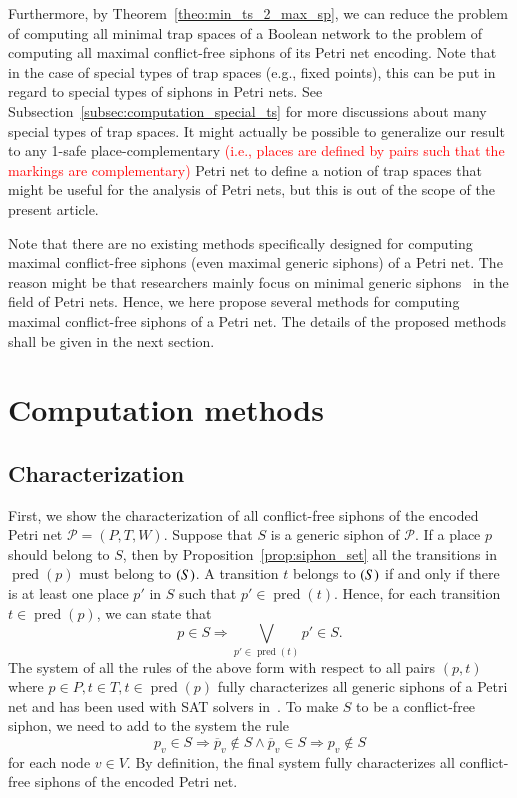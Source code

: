 \documentclass[preprint,12pt]{elsarticle}
\newcommand{\change}[1]{\textcolor{red}{#1}}
\DeclareMathOperator{\pred}{pred}
\let\succ\relax
\DeclareMathOperator{\succ}{succ}
\begin{document}
Furthermore, by Theorem~\ref{theo:min_ts_2_max_sp}, we can reduce the problem of computing all minimal trap spaces of a Boolean network to the problem of computing all maximal conflict-free siphons of its Petri net encoding.
Note that in the case of special types of trap spaces (e.g., fixed points), this can be put in regard to special types of siphons in Petri nets.
See Subsection~\ref{subsec:computation_special_ts} for more discussions about many special types of trap spaces.
It might actually be possible to generalize our result to any 1-safe place-complementary \change{(i.e., places are defined by pairs such that the markings are complementary)} Petri net to define a notion of trap spaces that might be useful for the analysis of Petri nets, but this is out of the scope of the present article.

Note that there are no existing methods specifically designed for computing maximal conflict-free siphons (even maximal generic siphons) of a Petri net.
The reason might be that researchers mainly focus on minimal generic siphons~\cite{DBLP:journals/isci/LiuB16} in the field of Petri nets.
Hence, we here propose several methods for computing maximal conflict-free siphons of a Petri net.
The details of the proposed methods shall be given in the next section.

\section{Computation methods}%
\label{sec:Computation}

\subsection{Characterization}%
\label{subsec:siphon_characterization}

First, we show the characterization of all conflict-free siphons of the encoded Petri net \(\mathcal{P} = (P, T, W)\).
Suppose that \(S\) is a generic siphon of \(\mathcal{P}\). If a place \(p\) should belong to \(S\), then by Proposition~\ref{prop:siphon_set} all the transitions in \(\pred(p)\) must belong to \(\succ(S)\).
A transition \(t\) belongs to \(\succ(S)\) if and only if there is at least one place \(p'\) in \(S\) such that \(p' \in \pred(t)\).
Hence, for each transition \(t \in \pred(p)\), we can state that
\begin{equation}
\label{eq:siphon}
p \in S \Rightarrow \bigvee_{p' \in \pred(t)}p' \in S.
\end{equation}
The system of all the rules of the above form with respect to all pairs \((p, t)\) where \(p \in P, t \in T, t \in \pred(p)\) fully characterizes all generic siphons of a Petri net and has been used with SAT solvers in~\cite{oanea2010new,nabli2016enumerating}.
To make \(S\) to be a conflict-free siphon, we need to add to the system the rule
\begin{equation}
\label{eq:conflict}
p_v \in S \Rightarrow \overline{p}_v \not \in S \wedge \overline{p}_v \in S \Rightarrow p_v \not \in S
\end{equation}for each node \(v \in V\).
By definition, the final system fully characterizes all conflict-free siphons of the encoded Petri net.
\end{document}
